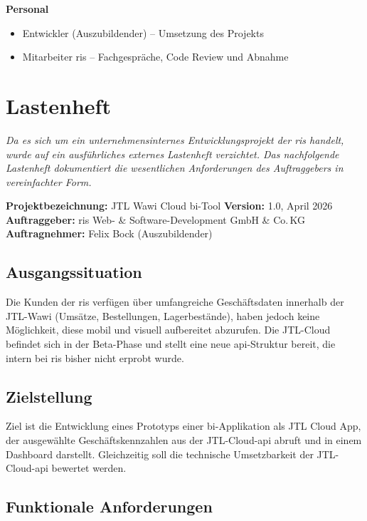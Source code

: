 \documentclass[11pt, a4paper, oneside]{report}
\begin{document}
\textbf{Personal}
\begin{itemize}[leftmargin=1.5em]
  \item Entwickler (Auszubildender) -- Umsetzung des Projekts
  \item Mitarbeiter \gls{ris} -- Fachgespräche, Code Review und Abnahme
\end{itemize}

\section{Lastenheft}
\label{anhang:lastenheft}

\textit{Da es sich um ein unternehmensinternes Entwicklungsprojekt der \gls{ris} handelt,
wurde auf ein ausführliches externes Lastenheft verzichtet. Das nachfolgende Lastenheft
dokumentiert die wesentlichen Anforderungen des Auftraggebers in vereinfachter Form.}

\medskip
\noindent\textbf{Projektbezeichnung:} JTL Wawi Cloud \gls{bi}-Tool \quad
\textbf{Version:} 1.0, April 2026 \\
\textbf{Auftraggeber:} \gls{ris} Web- \& Software-Development GmbH \& Co.\,KG \\
\textbf{Auftragnehmer:} Felix Bock (Auszubildender)

\subsection*{Ausgangssituation}

Die Kunden der \gls{ris} verfügen über umfangreiche Geschäftsdaten innerhalb der
JTL-Wawi (Umsätze, Bestellungen, Lagerbestände), haben jedoch keine Möglichkeit,
diese mobil und visuell aufbereitet abzurufen. Die JTL-Cloud befindet sich in der
Beta-Phase und stellt eine neue \gls{api}-Struktur bereit, die intern bei \gls{ris}
bisher nicht erprobt wurde.

\subsection*{Zielstellung}

Ziel ist die Entwicklung eines Prototyps einer \gls{bi}-Applikation als JTL Cloud App,
der ausgewählte Geschäftskennzahlen aus der JTL-Cloud-\gls{api} abruft und in einem
Dashboard darstellt. Gleichzeitig soll die technische Umsetzbarkeit der
JTL-Cloud-\gls{api} bewertet werden.

\subsection*{Funktionale Anforderungen}
\end{document}
